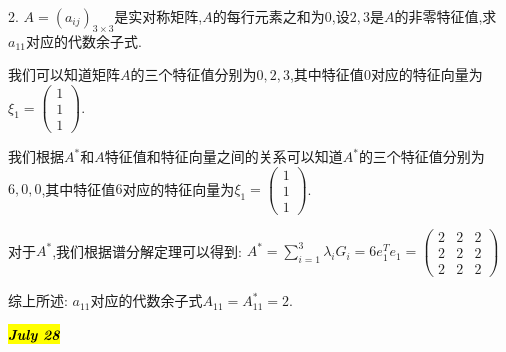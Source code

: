 2. $A=(a_{ij})_{3\times 3}$是实对称矩阵,$A$的每行元素之和为$0$,设$2,3$是$A$的非零特征值,求$a_{11}$对应的代数余子式.
\begin{solution}
	
	我们可以知道矩阵$A$的三个特征值分别为$0,2,3$,其中特征值$0$对应的特征向量为$\xi_{1}=\left( \begin{matrix}
		1\\1\\1
	\end{matrix}\right)$.

我们根据$A^{*}$和$A$特征值和特征向量之间的关系可以知道$A^{*}$的三个特征值分别为$6,0,0$,其中特征值$6$对应的特征向量为$\xi_{1}=\left( \begin{matrix}
	1\\1\\1
\end{matrix}\right)$.

对于$A^{*}$,我们根据谱分解定理可以得到: $A^{*}=\sum\limits_{i=1}^{3}\lambda_{i}G_{i}=6e_{1}^{T}e_{1}=\left( \begin{matrix}
	2&2&2\\2&2&2\\2&2&2
\end{matrix}\right) $

综上所述: $a_{11}$对应的代数余子式$A_{11}=A^{*}_{11}=2$.
\end{solution}

\hl{\textbf{\textit{July 28}}}

